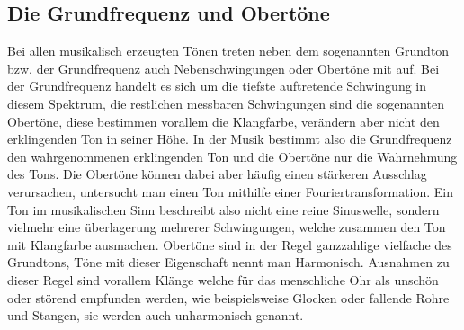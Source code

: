 \subsection{Die Grundfrequenz und Obertöne}
\label{sec:Oberton} \label{sec:Nebenschwingung} \label{sec:Grundfrequenz}
Bei allen musikalisch erzeugten Tönen treten neben dem sogenannten Grundton bzw. der Grundfrequenz auch Nebenschwingungen oder Obertöne mit auf.
Bei der Grundfrequenz handelt es sich um die tiefste auftretende Schwingung in diesem Spektrum, die restlichen messbaren Schwingungen sind die sogenannten Obertöne, diese bestimmen vorallem die Klangfarbe, verändern aber nicht den erklingenden Ton in seiner Höhe.
In der Musik bestimmt also die Grundfrequenz den wahrgenommenen erklingenden Ton und die Obertöne nur die Wahrnehmung des Tons. Die Obertöne können dabei aber häufig einen stärkeren Ausschlag verursachen, untersucht man einen Ton mithilfe
einer Fouriertransformation. Ein Ton im musikalischen Sinn beschreibt also nicht eine reine Sinuswelle, sondern vielmehr eine überlagerung mehrerer Schwingungen, welche zusammen den Ton mit Klangfarbe ausmachen. Obertöne sind in der Regel ganzzahlige vielfache 
des Grundtons, Töne mit dieser Eigenschaft nennt man Harmonisch. Ausnahmen zu dieser Regel sind vorallem Klänge welche für das menschliche Ohr als unschön oder störend empfunden werden, wie
beispielsweise Glocken oder fallende Rohre und Stangen, sie werden auch unharmonisch genannt. \cite{abcmusik}


